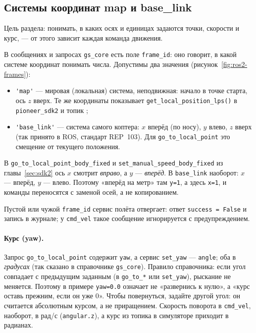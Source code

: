 \subsection{Системы координат map и base\_link}
\label{sec:ros2-frames}

Цель раздела: понимать, в каких осях и единицах задаются точки, скорости и курс, --- от этого зависит каждая команда движения.

В сообщениях и запросах \texttt{gs\_core} есть поле \verb|frame_id|: оно говорит, в какой системе координат понимать числа. Допустимы два значения (рисунок~\ref{fig:ros2-frames}):
\begin{itemize}
    \item \verb|'map'| --- мировая (локальная) система, неподвижная: начало в точке старта, ось $z$ вверх. Те же координаты показывает \verb|get_local_position_lps()| в \texttt{pioneer\_sdk2} и топик ;
    \item \verb|'base_link'| --- система самого коптера: $x$ вперёд (по носу), $y$ влево, $z$ вверх (так принято в ROS, стандарт REP~103). Для \verb|go_to_local_point| это смещение от текущего положения.
\end{itemize}



\begin{warnbox}
В \verb|go_to_local_point_body_fixed| и \verb|set_manual_speed_body_fixed| из главы~\ref{sec:sdk2} ось $x$ смотрит \emph{вправо}, а $y$ --- \emph{вперёд}. В \texttt{base\_link} наоборот: $x$ --- вперёд, $y$ --- влево. Поэтому «вперёд на метр» там \verb|y=1|, а здесь \verb|x=1|, и команды переносятся с заменой осей, а не копированием.
\end{warnbox}

Пустой или чужой \verb|frame_id| сервис полёта отвергает: ответ \verb|success = False| и запись в журнале; у \verb|cmd_vel| такое сообщение игнорируется с предупреждением.

\paragraph{Курс (yaw).} Запрос \verb|go_to_local_point| содержит \verb|yaw|, а сервис \verb|set_yaw| --- \verb|angle|; оба в \emph{градусах} (так сказано в справочнике \texttt{gs\_core}). Правило справочника: если угол совпадает с предыдущим заданным (в \verb|go_to_*| или \verb|set_yaw|), рыскание не меняется. Поэтому в примере \verb|yaw=0.0| означает не «развернись к нулю», а «курс оставь прежним, если он уже 0». Чтобы повернуться, задайте другой угол: он считается абсолютным курсом, а не приращением. Скорость поворота в \verb|cmd_vel|, наоборот, в рад/с (\verb|angular.z|), а курс из топика  в симуляторе приходит в радианах.

